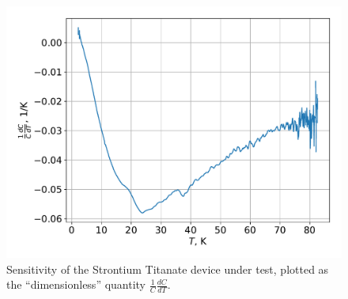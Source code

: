 \documentclass{thesis-umich}
\begin{document}
\begin{figure}
\caption[Sensitivity of STO Test Device]{Sensitivity of the Strontium Titanate device under test, plotted as the ``dimensionless'' quantity \(\frac{1}{C} \frac{dC}{dT}\).}
	\label{fig:sto_sens_vs_t}
	\includegraphics[width=\columnwidth]{figures/STO_dCdT_vs_T.pdf}
\end{figure}
\end{document}
